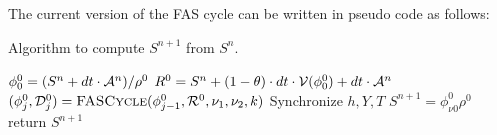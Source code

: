\documentclass[11pt]{article}
\begin{document}
\newpage
The current version of the FAS cycle can be written in pseudo code as follows:

\begin{algorithm}[H]
\caption{Algorithm to compute ${S}^{n+1}$ from ${S}^{n}$.}
\begin{algorithmic}
   \State ${\phi}^{0}_{0} = ({S}^{n} + dt \cdot {\cal A}^{n})/ {\rho}^{0}$
   \State ${R}^{0} = {S}^{n} + (1-\theta)\cdot dt \cdot {\cal V}({\phi}^{0}_{0})
                           + dt \cdot {\cal A}^{n}$
      \State $({\phi}^{0}_{j},{\cal D}^{0}_{j}) = \mbox{\sc FASCycle}({\phi}^{0}_{j-1},{\cal R}^{0},{\nu_1},{\nu_2},k)$
   \EndFor
   \State Synchronize $h,Y,T$
   \State ${S}^{n+1} = {\phi}^{0}_{\nu0} {\rho}^{0}$
   \State return ${S}^{n+1}$
\EndProcedure
\end{algorithmic}
\end{algorithm}
\end{document}

